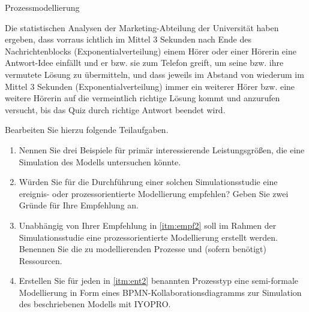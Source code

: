 \documentclass{article}
\begin{document}
\begin{exercise}{Prozessmodellierung}
\begin{itemize}
  \end{itemize}
  \par Die statistischen Analysen der Marketing-Abteilung der Universität haben ergeben, dass vorraus ichtlich im Mittel 3 Sekunden nach Ende des Nachrichtenblocks (Exponentialverteilung) einem Hörer oder einer Hörerin eine Antwort-Idee einfällt und er bzw. sie zum Telefon greift, um seine bzw. ihre vermutete Lösung zu übermitteln, und dass jeweils im Abstand von wiederum im Mittel 3 Sekunden (Exponentialverteilung) immer ein weiterer Hörer bzw. eine weitere Hörerin auf die vermeintlich richtige Lösung kommt und anzurufen versucht, bis das Quiz durch richtige Antwort beendet wird.

  Bearbeiten Sie hierzu folgende Teilaufgaben.
  \begin{enumerate}
    \item\label{itm:prim2} Nennen Sie drei Beispiele für primär interessierende Leistungsgrößen, die eine Simulation des Modells untersuchen könnte.
    \item\label{itm:empf2} Würden Sie für die Durchführung einer solchen Simulationsstudie eine ereignis- oder prozessorientierte Modellierung empfehlen? Geben Sie zwei Gründe für Ihre Empfehlung an.
    \item\label{itm:ent2} Unabhängig von Ihrer Empfehlung in \ref{itm:empf2} soll im Rahmen der Simulationsstudie eine prozessorientierte Modellierung erstellt werden. Benennen Sie die zu modellierenden Prozesse und (sofern benötigt) Ressourcen.
    \item\label{itm:mod2} Erstellen Sie für jeden in \ref{itm:ent2} benannten Prozesstyp eine semi-formale Modellierung in Form eines BPMN-Kollaborationsdiagramms zur Simulation des beschriebenen Modells mit IYOPRO.
  \end{enumerate}


\end{exercise}
\end{document}
